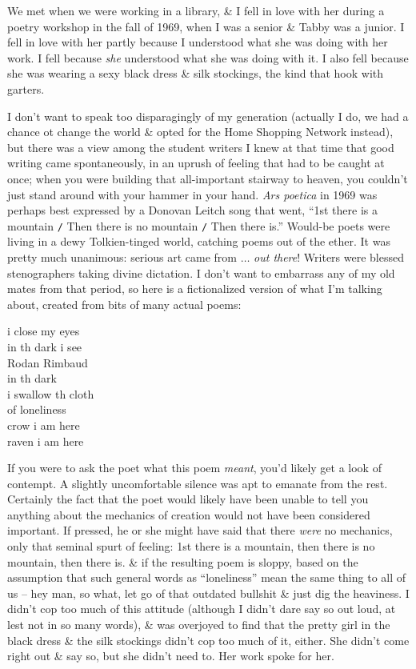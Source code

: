 \documentclass{article}
\numberwithin{equation}{section}
\begin{document}
We met when we were working in a library, \& I fell in love with her during a poetry workshop in the fall of 1969, when I was a senior \& Tabby was a junior. I fell in love with her partly because I understood what she was doing with her work. I fell because \textit{she} understood what she was doing with it. I also fell because she was wearing a sexy black dress \& silk stockings, the kind that hook with garters.

I don't want to speak too disparagingly of my generation (actually I do, we had a chance ot change the world \& opted for the Home Shopping Network instead), but there was a view among the student writers I knew at that time that good writing came spontaneously, in an uprush of feeling that had to be caught at once; when you were building that all-important stairway to heaven, you couldn't just stand around with your hammer in your hand. \textit{Ars poetica} in 1969 was perhaps best expressed by a Donovan Leitch song that went, ``1st there is a mountain {\tt/} Then there is no mountain {\tt/} Then there is.'' Would-be poets were living in a dewy Tolkien-tinged world, catching poems out of the ether. It was pretty much unanimous: serious art came from $\ldots$ \textit{out there}! Writers were blessed stenographers taking divine dictation. I don't want to embarrass any of my old mates from that period, so here is a fictionalized version of what I'm talking about, created from bits of many actual poems:
\begin{center}
	i close my eyes\\in th dark i see\\Rodan Rimbaud\\in th dark\\ i swallow th cloth\\ of loneliness\\crow i am here\\raven i am here	
\end{center}
If you were to ask the poet what this poem \textit{meant}, you'd likely get a look of contempt. A slightly uncomfortable silence was apt to emanate from the rest. Certainly the fact that the poet would likely have been unable to tell you anything about the mechanics of creation would not have been considered important. If pressed, he or she might have said that there \textit{were} no mechanics, only that seminal spurt of feeling: 1st there is a mountain, then there is no mountain, then there is. \& if the resulting poem is sloppy, based on the assumption that such general words as ``loneliness'' mean the same thing to all of us -- hey man, so what, let go of that outdated bullshit \& just dig the heaviness. I didn't cop too much of this attitude (although I didn't dare say so out loud, at lest not in so many words), \& was overjoyed to find that the pretty girl in the black dress \& the silk stockings didn't cop too much of it, either. She didn't come right out \& say so, but she didn't need to. Her work spoke for her.
\end{document}
